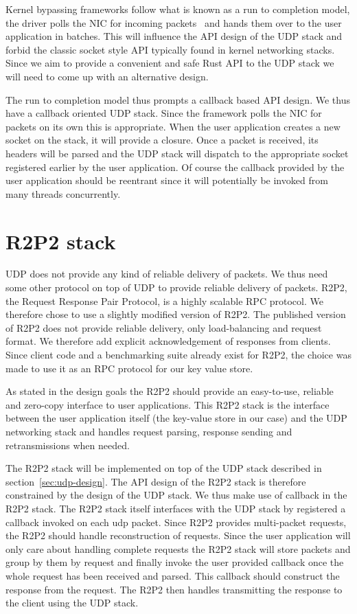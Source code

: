\documentclass[11pt]{book}
\begin{document}
Kernel bypassing frameworks follow what is known as a run to
completion model, the driver polls the NIC for incoming
packets~\cite{dpdk-pmd} and hands them over to the user application in
batches. This will influence the API design of the UDP stack and
forbid the classic socket style API typically found in kernel
networking stacks. Since we aim to provide a convenient and safe Rust
API to the UDP stack we will need to come up with an alternative
design.

The run to completion model thus prompts a callback based API
design. We thus have a callback oriented UDP stack. Since the
framework polls the NIC for packets on its own this is
appropriate. When the user application creates a new socket on the
stack, it will provide a closure. Once a packet is received, its
headers will be parsed and the UDP stack will dispatch to the
appropriate socket registered earlier by the user application. Of
course the callback provided by the user application should be
reentrant since it will potentially be invoked from many threads
concurrently.

\section{R2P2 stack}

UDP does not provide any kind of reliable delivery of packets. We thus
need some other protocol on top of UDP to provide reliable delivery of
packets. R2P2, the Request Response Pair Protocol, is a highly
scalable RPC protocol. We therefore chose to use a slightly modified
version of R2P2. The published version of R2P2 does not provide
reliable delivery, only load-balancing and request format. We
therefore add explicit acknowledgement of responses from
clients. Since client code and a benchmarking suite  already exist for
R2P2, the choice was made to use it as an RPC protocol for our key
value store.

As stated in the design goals the R2P2 should provide an easy-to-use,
reliable and zero-copy interface to user applications. This R2P2 stack is the
interface between the user application itself (the key-value store in
our case) and the UDP networking stack and handles request parsing,
response sending and retransmissions when needed.

The R2P2 stack will be implemented on top of the UDP stack described in
section~\ref{sec:udp-design}. The API design of the R2P2 stack is
therefore constrained by the design of the UDP stack. We thus make use
of callback in the R2P2 stack. The R2P2 stack itself interfaces with
the UDP stack by registered a callback invoked on each udp
packet. Since R2P2 provides multi-packet requests, the R2P2 should
handle reconstruction of requests. Since the user application will
only care about handling complete requests the R2P2 stack will store
packets and group by them by request and finally invoke the user
provided callback once the whole request has been received and
parsed. This callback should construct the response from the
request. The R2P2 then handles transmitting the response to the client
using the UDP stack.
\end{document}
